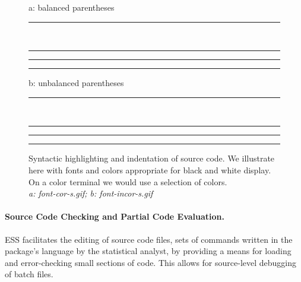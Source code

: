 \documentclass{article}
\newcommand{\emptyfig}{
\hspace*{42pt}\rule{324pt}{.25pt}\\
\hspace*{42pt}\rule{.25pt}{10pc}
\rule{316pt}{.25pt}
\rule{.25pt}{10pc}}
\begin{document}
\begin{figure}
a: balanced parentheses\\
\emptyfig

b: unbalanced parentheses\\
\emptyfig
\caption[place holder for a long caption]{Syntactic highlighting and
indentation of source code.  We illustrate here with fonts and colors
appropriate for black and white display.  On a color terminal we would
use a selection of colors.\\
{\it a: font-cor-s.gif; b: font-incor-s.gif}
\label{f.font}}
\end{figure}

\paragraph{Source Code Checking and Partial Code Evaluation.}

ESS facilitates the editing of source code files, sets of commands
written in the package's language by the statistical analyst, by
providing a means for loading and error-checking small sections of
code.  This allows for source-level debugging of batch files.
\end{document}
